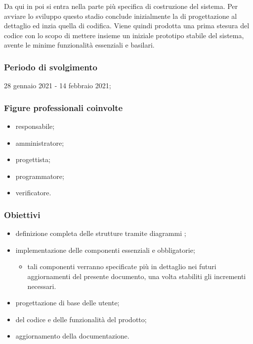 Da qui in poi si entra nella parte più specifica di costruzione del sistema. Per avviare lo sviluppo questo stadio conclude inizialmente la  di progettazione al dettaglio ed inzia quella di codifica. Viene quindi prodotta una prima stesura del codice con lo scopo di mettere insieme un iniziale prototipo stabile del sistema, avente le minime funzionalità essenziali e basilari. 
        
        \subsubsection{Periodo di svolgimento}
        28 gennaio 2021 - 14 febbraio 2021;
        
        \subsubsection{Figure professionali coinvolte}
            \begin{itemize}
                \item responsabile;
                \item amministratore;
                \item progettista;
                \item programmatore;
                \item verificatore.
            \end{itemize}

        \subsubsection{Obiettivi}    
        \begin{itemize}
            \item definizione completa delle strutture tramite diagrammi ;
            \item implementazione delle componenti essenziali e obbligatorie;
            \begin{itemize}
                \item tali componenti verranno specificate più in dettaglio nei futuri aggiornamenti del presente documento, una volta stabiliti gli incrementi necessari.
            \end{itemize}
            \item progettazione di base delle  utente;
            \item {} del codice e delle funzionalità del prodotto;
            \item aggiornamento della documentazione.
        \end{itemize}